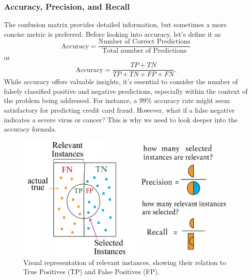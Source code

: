 \documentclass[12pt,letter]{article}
\begin{document}
\subsubsection{Accuracy, Precision, and Recall}
The confusion matrix provides detailed information, but sometimes a more concise metric is preferred. Before looking into accuracy, let's define it as
\begin{equation}
\text{Accuracy} = \frac{\text{Number of Correct Predictions}}{\text{Total number of Predictions}}
\end{equation}
or
\begin{equation}
\text{Accuracy} = \frac{TP+TN}{TP+TN+FP+FN}.
\end{equation}
While accuracy offers valuable insights, it's essential to consider the number of falsely classified positive and negative predictions, especially within the context of the problem being addressed. For instance, a 99\% accuracy rate might seem satisfactory for predicting credit card fraud. However, what if a false negative indicates a severe virus or cancer? This is why we need to look deeper into the accuracy formula.


\begin{figure}[H]
    \centering
    \includegraphics[width=4.9in]{../figures/piechart_TP_vs_FP.png}
	\vspace{-1ex}
    \caption{Visual representation of relevant instances, showing their relation to True Positives (TP) and False Positives (FP). }
    \label{fig:piechart_TP_vs_FP}
\end{figure}
\end{document}
